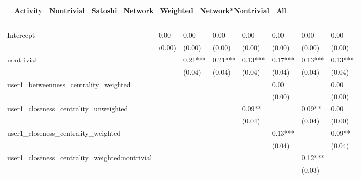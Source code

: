 \begin{table}
\caption{}
\begin{center}
\begin{tabular}{lccccccc}
\hline
                                               & Activity & Nontrivial & Satoshi & Network & Weighted & Network*Nontrivial &   All    \\
\hline
\hline
\end{tabular}
\begin{tabular}{llllllll}
Intercept                                      & 0.00     & 0.00       & 0.00    & 0.00    & 0.00     & 0.00               & 0.00     \\
                                               & (0.00)   & (0.00)     & (0.00)  & (0.00)  & (0.00)   & (0.00)             & (0.00)   \\
nontrivial                                     &          & 0.21***    & 0.21*** & 0.13*** & 0.17***  & 0.13***            & 0.13***  \\
                                               &          & (0.04)     & (0.04)  & (0.04)  & (0.04)   & (0.04)             & (0.04)   \\
user1_betweenness_centrality_weighted          &          &            &         &         & 0.00     &                    & 0.00     \\
                                               &          &            &         &         & (0.00)   &                    & (0.00)   \\
user1_closeness_centrality_unweighted          &          &            &         & 0.09**  &          & 0.09**             & 0.00     \\
                                               &          &            &         & (0.04)  &          & (0.04)             & (0.00)   \\
user1_closeness_centrality_weighted            &          &            &         &         & 0.13***  &                    & 0.09**   \\
                                               &          &            &         &         & (0.04)   &                    & (0.04)   \\
user1_closeness_centrality_weighted:nontrivial &          &            &         &         &          & 0.12***            &          \\
                                               &          &            &         &         &          & (0.03)             &          \\

\end{tabular}
\end{center}
\end{table}
